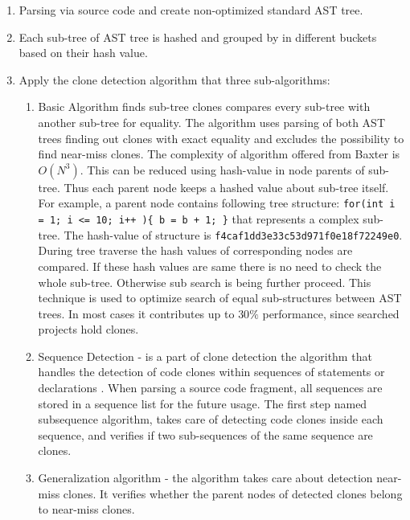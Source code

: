 \documentclass{report}
\begin{document}
\begin{enumerate}
	\item Parsing via source code and create non-optimized standard AST tree.
	\item Each sub-tree of AST tree is hashed and grouped by in different buckets based on their hash value. 
	\item Apply the clone detection algorithm that three sub-algorithms:
		\begin{enumerate}[label*=\arabic*.]
		\item Basic Algorithm finds sub-tree clones compares every sub-tree with another sub-tree for equality. The algorithm uses parsing of both AST trees finding out clones with exact equality and excludes the possibility to find near-miss clones. The complexity of algorithm offered from Baxter \cite{baxter} is 
$ O(N^3)$. This can be reduced using hash-value in node parents of sub-tree. Thus each parent node keeps a hashed value about sub-tree itself. For example, a parent node contains following tree structure: \texttt{for(int i = 1; i <= 10; i++ )\{ b = b + 1; \}} that represents a complex sub-tree. The hash-value of structure is \texttt{f4caf1dd3e33c53d971f0e18f72249e0}. During tree traverse the hash values of corresponding nodes are compared. If these hash values are same there is no need to check the whole sub-tree. Otherwise sub search is being further proceed. This technique is used to optimize search of equal sub-structures between AST trees. In most cases it contributes up to $30\%$ performance, since searched projects hold clones.
		\item Sequence Detection - is a part of clone detection the algorithm that handles the detection of code clones within sequences of statements or declarations \cite{flavius}. When parsing a source code fragment, all sequences are stored in a sequence list for the future usage. The first step named subsequence algorithm, takes care of detecting code clones inside each sequence, and verifies if two sub-sequences of the same sequence are clones.	
		\item Generalization algorithm - the algorithm takes care about detection near-miss clones. It verifies whether the parent nodes of detected clones belong to near-miss clones.
		 \end{enumerate} 
\end{enumerate}
\end{document}

